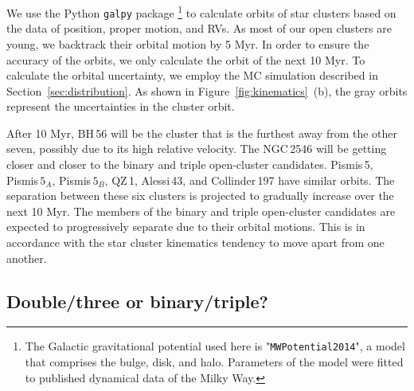 \documentclass{aa} %
\begin{document}

We use the Python \texttt{galpy} package \citep{2015ApJS..216...29B} \footnote{The Galactic 
gravitational potential used here is "\texttt{MWPotential2014}", a model that comprises the bulge, 
disk, and halo. Parameters of the model were fitted to published dynamical data of the Milky Way.} to 
calculate orbits of star clusters based on the data of position, proper motion, and RVs. As 
most of our open clusters are young, we backtrack their orbital motion by 5 Myr. In order to ensure the 
accuracy of the orbits, we only calculate the orbit of the next 10 Myr. To calculate the orbital 
uncertainty, we employ the MC simulation described in Section~\ref{sec:distribution}. As shown in Figure~\ref{fig:kinematics}~(b), the gray orbits represent the uncertainties 
in the cluster orbit.

After 10 Myr, BH\,56 will be the cluster that is the furthest away from the other seven, possibly due to its 
high relative velocity. The NGC\,2546 will be getting closer and closer to the binary and triple open-cluster candidates.
Pismis\,5, Pismis$\,5_{A}$, Pismis$\,5_{B}$, QZ\,1, Alessi\,43, and Collinder\,197 have similar orbits.
The separation between these six clusters is projected to gradually increase over the next 10 Myr. 
The members of the binary and triple open-cluster candidates are expected to progressively separate due to their orbital motions.
This is in accordance with the star cluster kinematics tendency to move apart from one another.



\subsection{Double/three or binary/triple?} \label{sec:binary}
\end{document}
